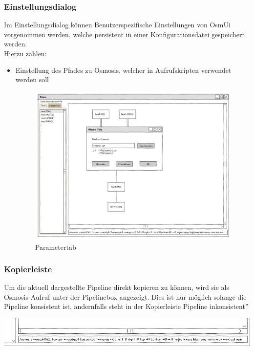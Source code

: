 \documentclass[a4paper,12pt]{scrartcl}
\begin{document}
\subsubsection{Einstellungsdialog}
Im Einstellungsdialog können Benutzerspezifische Einstellungen von OsmUi vorgenommen werden, welche persistent in einer Konfigurationsdatei gespeichert werden.\\
Hierzu zählen:\\
\begin{itemize}
 \item Einstellung des Pfades zu Osmosis, welcher in Aufrufskripten verwendet werden soll\\
\begin{center}
\begin{figure}[h!]
\includegraphics[width=15cm]{ui_prototype/OsmUi_Einstellungen.png}
\caption{Parametertab}
\end{figure}
\end{center}
\end{itemize}


\subsubsection{Kopierleiste}
Um die aktuell dargestellte Pipeline direkt kopieren zu können, wird sie als Osmosis-Aufruf unter der Pipelinebox angezeigt. Dies ist nur möglich
solange die Pipeline konsistent ist, andernfalls steht in der Kopierleiste \glqq Pipeline inkonsistent''
\begin{center}
\includegraphics[width=15cm]{ui_prototype/OsmUi_Leisteklein.png}
\end{center}
\end{document}
